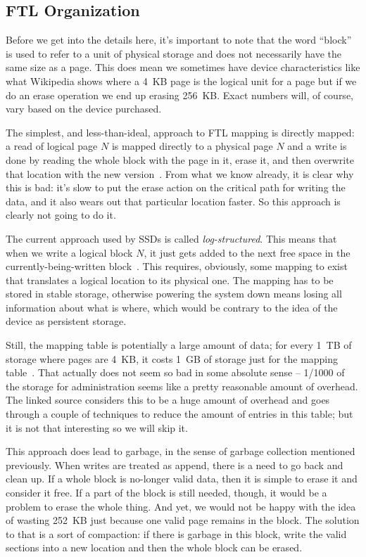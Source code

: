 \subsection*{FTL Organization}
Before we get into the details here, it's important to note that the word ``block'' is used to refer to a unit of physical storage and does not necessarily have the same size as a page. This does mean we sometimes have device characteristics like what Wikipedia shows where a 4~KB page is the logical unit for a page but if we do an erase operation we end up erasing 256~KB. Exact numbers will, of course, vary based on the device purchased.

The simplest, and less-than-ideal, approach to FTL mapping is directly mapped: a read of logical page $N$ is mapped directly to a physical page $N$ and a write is done by reading the whole block with the page in it, erase it, and then overwrite that location with the new version~\cite{OSTEP}. From what we know already, it is clear why this is bad: it's slow to put the erase action on the critical path for writing the data, and it also wears out that particular location faster. So this approach is clearly not going to do it.

The current approach used by SSDs is called \textit{log-structured}. This means that when we write a logical block $N$, it just gets added to the next free space in the currently-being-written block~\cite{OSTEP}. This requires, obviously, some mapping to exist that translates a logical location to its physical one. The mapping has to be stored in stable storage, otherwise powering the system down means losing all information about what is where, which would be contrary to the idea of the device as persistent storage.

Still, the mapping table is potentially a large amount of data; for every 1~TB of storage where pages are 4~KB, it costs 1~GB of storage just for the mapping table~\cite{OSTEP}. That actually does not seem so bad in some absolute sense -- 1/1000 of the storage for administration seems like a pretty reasonable amount of overhead. The linked source considers this to be a huge amount of overhead and goes through a couple of techniques to reduce the amount of entries in this table; but it is not that interesting so we will skip it. 

This approach does lead to garbage, in the sense of garbage collection mentioned previously. When writes are treated as append, there is a need to go back and clean up. If a whole block is no-longer valid data, then it is simple to erase it and consider it free. If a part of the block is still needed, though, it would be a problem to erase the whole thing. And yet, we would not be happy with the idea of wasting 252~KB just because one valid page remains in the block. The solution to that is a sort of compaction: if there is garbage in this block, write the valid sections into a new location and then the whole block can be erased.

